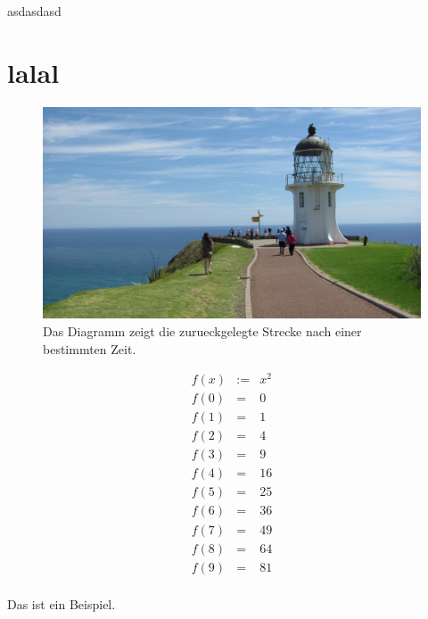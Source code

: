 \documentclass{article}
\begin{document}
asdasdasd

\section{lalal}
\begin{figure}[htbp]
    \centering
    \includegraphics[width=.9\textwidth]{./image}
    \caption{Das Diagramm zeigt die zurueckgelegte Strecke nach einer bestimmten Zeit.}
    \label{fig:st-diag}
\end{figure}

\begin{eqnarray}
f(x) & := & x^2 \\
f( 0 )  &=&  0 \nonumber\\
f( 1 )  &=&  1 \nonumber\\
f( 2 )  &=&  4 \nonumber\\
f( 3 )  &=&  9 \nonumber\\
f( 4 )  &=&  16 \nonumber\\
f( 5 )  &=&  25 \nonumber\\
f( 6 )  &=&  36 \nonumber\\
f( 7 )  &=&  49 \nonumber\\
f( 8 )  &=&  64 \nonumber\\
f( 9 )  &=&  81 \nonumber\\
\end{eqnarray}


Das ist ein Beispiel.
\end{document}
